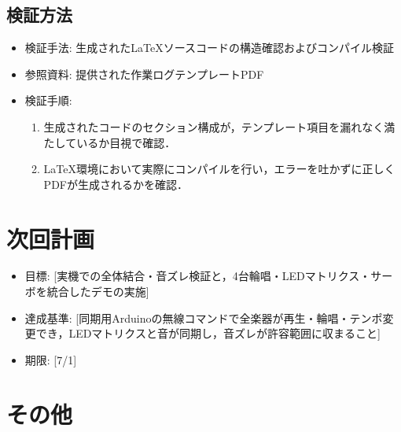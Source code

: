 \documentclass[uplatex,dvipdfmx]{jlreq}
\begin{document}
\subsection{検証方法}
\begin{itemize}
    \item  検証手法: 生成された\LaTeX ソースコードの構造確認およびコンパイル検証
    \item  参照資料: 提供された作業ログテンプレートPDF
    \item  検証手順:
    \begin{enumerate}
        \item 生成されたコードのセクション構成が，テンプレート項目を漏れなく満たしているか目視で確認．
        \item \LaTeX 環境において実際にコンパイルを行い，エラーを吐かずに正しくPDFが生成されるかを確認．
    \end{enumerate}
\end{itemize}

\section{次回計画}
\begin{itemize}
    \item  目標: [実機での全体結合・音ズレ検証と，4台輪唱・LEDマトリクス・サーボを統合したデモの実施]
    \item  達成基準: [同期用Arduinoの無線コマンドで全楽器が再生・輪唱・テンポ変更でき，LEDマトリクスと音が同期し，音ズレが許容範囲に収まること]
    \item  期限: [7/1]
\end{itemize}

\section{その他}
\end{document}
